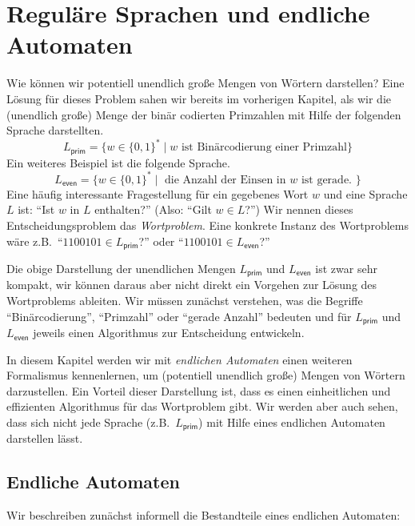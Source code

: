 \section[Reguläre Sprachen und endliche Automaten]{Reguläre Sprachen und endliche Automaten}\label{sec:reglang}
Wie können wir potentiell unendlich große Mengen von Wörtern darstellen?
Eine Lösung für dieses Problem sahen wir bereits im vorherigen Kapitel, als wir die (unendlich große) Menge der binär codierten Primzahlen mit Hilfe der folgenden Sprache darstellten.
\[
L_\mathsf{prim}=\{w\in\{0,1\}^*\mid w \text{ ist Binärcodierung einer Primzahl}\}
\]
Ein weiteres Beispiel ist die folgende Sprache.
\[
L_\mathsf{even}=\{w\in\{0,1\}^*\mid \text{ die Anzahl der Einsen in $w$ ist gerade. }\}
\]
Eine häufig interessante Fragestellung für ein gegebenes Wort $w$ und eine Sprache $L$ ist: "`Ist $w$ in $L$ enthalten?"' (Also: "`Gilt $w\in L$?"')
Wir nennen dieses Entscheidungsproblem das \emph{Wortproblem}. Eine konkrete Instanz des Wortproblems wäre z.B.\ "`$1100101\in L_\mathsf{prim}$?"' oder "`$1100101\in L_\mathsf{even}$?"'

Die obige Darstellung der unendlichen Mengen $L_\mathsf{prim}$ und $L_\mathsf{even}$ ist zwar sehr kompakt, 
wir können daraus aber nicht direkt ein Vorgehen zur Lösung des Wortproblems ableiten.
Wir müssen zunächst verstehen, was die Begriffe "`Binärcodierung"', "`Primzahl"' oder "`gerade Anzahl"' bedeuten und für $L_\mathsf{prim}$ und $L_\mathsf{even}$ jeweils einen Algorithmus zur Entscheidung entwickeln.

In diesem Kapitel werden wir mit \emph{endlichen Automaten} einen weiteren Formalismus kennenlernen, um (potentiell unendlich große) Mengen von Wörtern darzustellen. 
Ein Vorteil dieser Darstellung ist, dass es einen einheitlichen und effizienten Algorithmus für das Wortproblem gibt.
Wir werden aber auch sehen, dass sich nicht jede Sprache (z.B.\ $L_\mathsf{prim}$) mit Hilfe eines endlichen Automaten darstellen lässt.

\subsection{Endliche Automaten}
Wir beschreiben zunächst informell die Bestandteile eines endlichen Automaten:

\newcommand{\qinit}{q^\mathsf{init}}
\newcommand{\B}{\mathcal{B}}
\newcommand{\calN}{\mathcal{N}}
\newcommand{\calP}{\mathcal{P}}
\newcommand{\ecl}{\textsf{ecl}}
\newcommand{\reach}{\textsf{reach}}
\renewcommand{\0}{\underline{\smash{\emptyset}}}
\renewcommand{\1}{\underline{\smash{\Eps}}}
\newcommand{\hide}[1]{}

